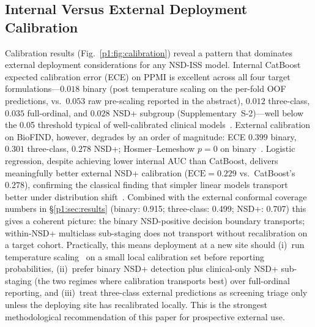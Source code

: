 \subsection{Internal Versus External Deployment Calibration}
\label{p1:sec:discussion:internal-vs-external}

Calibration results (Fig.~\ref{p1:fig:calibration}) reveal a pattern that dominates external deployment considerations for any NSD-ISS model. Internal CatBoost expected calibration error (ECE) on PPMI is excellent across all four target formulations---$0.018$ binary (post temperature scaling on the per-fold OOF predictions, vs.\ $0.053$ raw pre-scaling reported in the abstract), $0.012$ three-class, $0.035$ full-ordinal, and $0.028$ NSD+ subgroup (Supplementary~S-2)---well below the 0.05 threshold typical of well-calibrated clinical models~\cite{guo2017calibration}. External calibration on BioFIND, however, degrades by an order of magnitude: ECE $0.399$ binary, $0.301$ three-class, $0.278$ NSD+; Hosmer--Lemeshow $p{=}0$ on binary~\cite{naeini2015ece}. Logistic regression, despite achieving lower internal AUC than CatBoost, delivers meaningfully better external NSD+ calibration ($\mathrm{ECE}{=}0.229$ vs.\ CatBoost's $0.278$), confirming the classical finding that simpler linear models transport better under distribution shift~\cite{austin2020graphical}. Combined with the external conformal coverage numbers in \S\ref{p1:sec:results} (binary: 0.915; three-class: 0.499; NSD+: 0.707) this gives a coherent picture: the binary NSD-positive decision boundary transports; within-NSD+ multiclass sub-staging does not transport without recalibration on a target cohort. Practically, this means deployment at a new site should (i)~run temperature scaling~\cite{guo2017calibration} on a small local calibration set before reporting probabilities, (ii)~prefer binary NSD+ detection plus clinical-only NSD+ sub-staging (the two regimes where calibration transports best) over full-ordinal reporting, and (iii)~treat three-class external predictions as screening triage only unless the deploying site has recalibrated locally. This is the strongest methodological recommendation of this paper for prospective external use.

